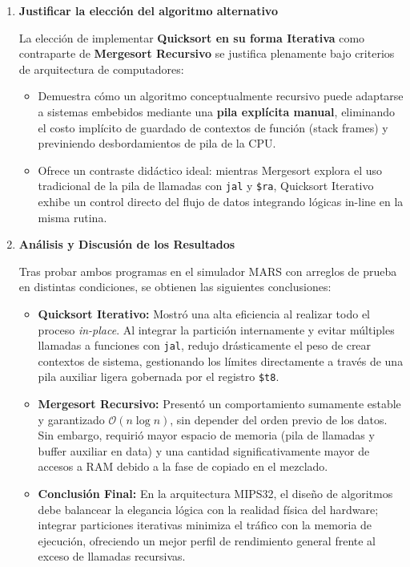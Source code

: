 \documentclass[12pt,letterpaper]{article}
\begin{document}
\begin{enumerate}
    \item \textbf{\large\color{UCBlue}Justificar la elección del algoritmo alternativo}
    
    \vspace{0.2cm}
    La elección de implementar \textbf{Quicksort en su forma Iterativa} como contraparte de \textbf{Mergesort Recursivo} se justifica plenamente bajo criterios de arquitectura de computadores:
    \begin{itemize}
        \item Demuestra cómo un algoritmo conceptualmente recursivo puede adaptarse a sistemas embebidos mediante una \textbf{pila explícita manual}, eliminando el costo implícito de guardado de contextos de función (stack frames) y previniendo desbordamientos de pila de la CPU.
        \item Ofrece un contraste didáctico ideal: mientras Mergesort explora el uso tradicional de la pila de llamadas con \texttt{jal} y \texttt{\$ra}, Quicksort Iterativo exhibe un control directo del flujo de datos integrando lógicas in-line en la misma rutina.
    \end{itemize}

    \item \textbf{\large\color{UCBlue}Análisis y Discusión de los Resultados}
    
    \vspace{0.2cm}
    Tras probar ambos programas en el simulador MARS con arreglos de prueba en distintas condiciones, se obtienen las siguientes conclusiones:
    \begin{itemize}
        \item \textbf{Quicksort Iterativo:} Mostró una alta eficiencia al realizar todo el proceso \textit{in-place}. Al integrar la partición internamente y evitar múltiples llamadas a funciones con \texttt{jal}, redujo drásticamente el peso de crear contextos de sistema, gestionando los límites directamente a través de una pila auxiliar ligera gobernada por el registro \texttt{\$t8}.
        \item \textbf{Mergesort Recursivo:} Presentó un comportamiento sumamente estable y garantizado $\mathcal{O}(n \log n)$, sin depender del orden previo de los datos. Sin embargo, requirió mayor espacio de memoria (pila de llamadas y buffer auxiliar en data) y una cantidad significativamente mayor de accesos a RAM debido a la fase de copiado en el mezclado.
        \item \textbf{Conclusión Final:} En la arquitectura MIPS32, el diseño de algoritmos debe balancear la elegancia lógica con la realidad física del hardware; integrar particiones iterativas minimiza el tráfico con la memoria de ejecución, ofreciendo un mejor perfil de rendimiento general frente al exceso de llamadas recursivas.
    \end{itemize}

\end{enumerate}
\end{document}
